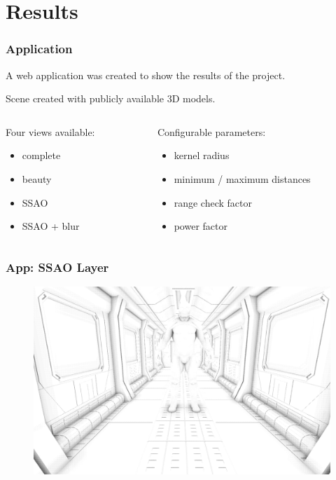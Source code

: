 \documentclass{beamer}
\newcommand{\redtext}[1]{\textcolor{myred}{#1}}
\begin{document}
\section{Results}

\begin{frame}
\frametitle{Application}
A \redtext{web application} was created to show the results of the project.

Scene created with publicly available 3D models.
\vspace{0.6cm}
\begin{columns}
    \begin{column}[t]{0.45\linewidth}
        \redtext{Four views} available:
        \begin{itemize}
            \item complete
            \item beauty
            \item SSAO
            \item SSAO + blur
        \end{itemize}
    \end{column}

    \begin{column}[t]{0.45\linewidth}
        \redtext{Configurable parameters}:
        \begin{itemize}
            \item kernel radius
            \item minimum / maximum distances
            \item range check factor
            \item power factor
        \end{itemize}
    \end{column}

\end{columns}

\end{frame}

\newcommand{\resultwidth}{0.9\linewidth}

\begin{frame}
\frametitle{App: SSAO Layer}
\begin{figure}
    \centering
    \includegraphics[width=\resultwidth]{images/app_ssao}
\end{figure}

\end{frame}
\end{document}
